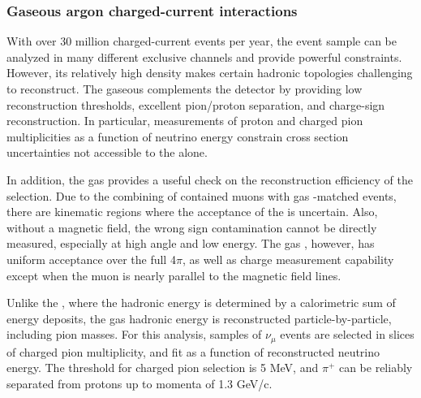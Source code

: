 \subsubsection{Gaseous argon charged-current interactions}

With over 30 million charged-current events per year, the  event sample can be analyzed in many different exclusive channels and provide powerful constraints. However, its relatively high density makes certain hadronic topologies challenging to reconstruct. The gaseous  complements the  detector by providing low reconstruction thresholds, excellent pion/proton separation, and charge-sign reconstruction. In particular, measurements of proton and charged pion multiplicities as a function of neutrino energy constrain cross section uncertainties not accessible to the  alone.

In addition, the gas  provides a useful check on the reconstruction efficiency of the  selection. Due to the combining of contained muons with gas -matched events, there are kinematic regions where the acceptance of the  is uncertain. Also, without a magnetic field, the wrong sign contamination cannot be directly measured, especially at high angle and low energy. The gas , however, has uniform acceptance over the full 4$\pi$, as well as charge measurement capability except when the muon is nearly parallel to the magnetic field lines.

Unlike the , where the hadronic energy is determined by a calorimetric sum of energy deposits, the gas  hadronic energy is reconstructed particle-by-particle, including pion masses. For this analysis, samples of $\nu_{\mu}$  events are selected in slices of charged pion multiplicity, and fit as a function of reconstructed neutrino energy. The threshold for charged pion selection is 5 MeV, and $\pi^{+}$ can be reliably separated from protons up to momenta of 1.3 GeV/c.


